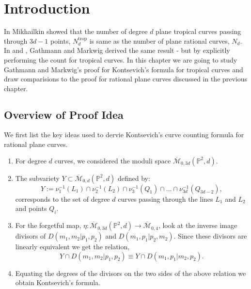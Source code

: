 \section{Introduction}
\par In \cite{mikhalkin2004enumerativetropicalalgebraicgeometry} Mikhailkin showed that the number of degree $d$ plane tropical curves passing through $3d-1$ points, $N^{\text{trop}}_{d}$ is same as the number of plane rational curves, $N_{d}$.
In \cite{GathmannMarkwig} and \cite{GATHMANNwdvv}, Gathmann and Markwig derived the same result - but by explicitly performing the count for tropical curves. 
In this chapter we are going to study Gathmann and Markwig's proof for Kontsevich's formula for tropical curves and draw comparisions to the proof for rational plane curves discussed in the previous chapter.

\subsection{Overview of Proof Idea}
We first list the key ideas used to dervie Kontsevich's curve counting formula for rational plane curves.
\begin{enumerate}
    \item For degree $d$ curves, we considered the moduli space $\overline{\mathcal{M}}_{0,3d}(\mathbb{P}^{2},d)$.
    \item The subvariety $Y \subset \overline{\mathcal{M}}_{0,d}(\mathbb{P}^{2},d)$ defined by:
        \[
            Y:= \nu_{1}^{-1}(L_{1}) \cap \nu_{2}^{-1}(L_{2}) \cap \nu_{3}^{-1}(Q_{1}) \cap \dots \cap \nu_{3d}^{-1}(Q_{3d-2}),
        \]
        corresponds to the set of degree $d$ curves passing through the lines $L_{1}$ and $L_{2}$ and points $Q_{i}$.
    \item For the forgetful map, $\eta: \overline{\mathcal{M}}_{0,3d}(\mathbb{P}^{2},d)\to \overline{\mathcal{M}}_{0,4}$, look at the inverse image divisors of $D(m_{1}, m_{2}|p_{1}, p_{2})$ and $D(m_{1}, p_{1}|p_{2}, m_{2})$.
        Since these divisors are linearly equivalent we get the relation, 
        \[
            Y \cap D(m_{1}, m_{2} | p_{1}, p_{2}) \equiv Y \cap D(m_{1}, p_{1} | m_{2}, p_{2}).
        \]
    \item Equating the degrees of the divisors on the two sides of the above relation we obtain Kontsevich's formula.
\end{enumerate}

